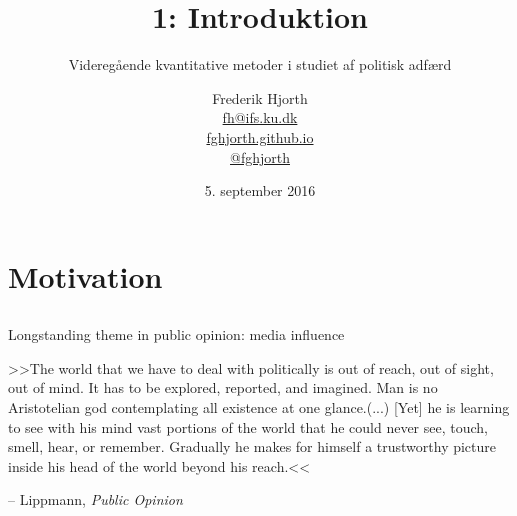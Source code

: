 \documentclass[10pt,aspectratio=169]{beamer}
\title{ 1: Introduktion }
\subtitle{ Videregående kvantitative metoder i studiet af politisk adfærd }
\date{5. september 2016}
\author[Frederik Hjorth]{Frederik Hjorth \\ \footnotesize
\href{mailto:fh@ifs.ku.dk}{fh@ifs.ku.dk} \\
\href{http://fghjorth.github.io}{fghjorth.github.io} \\
\href{http://twitter.com/fghjorth}{@fghjorth}}
\institute{Institut for Statskundskab \\ Københavns Universitet}
\begin{document}
\begin{frame}
\titlepage
\end{frame}


\section{Motivation}
\subsection{}

\begin{frame}
Longstanding theme in public opinion: media influence \pause
\begin{block}{}
>>The world that we have to deal with politically is out of reach, out of sight, out of mind. It has to be explored, reported, and imagined. Man is no Aristotelian god contemplating all existence at one glance.\pause (...) [Yet] he is learning to see with his mind vast portions of the world that he could never see, touch, smell, hear, or remember. Gradually he makes for himself a trustworthy picture inside his head of the world beyond his reach.<<	
\end{block} \pause
\raggedleft -- Lippmann, \textit{Public Opinion}
\end{frame}



\begin{frame}[allowframebreaks]
\scriptsize


\end{frame}
\end{document}
